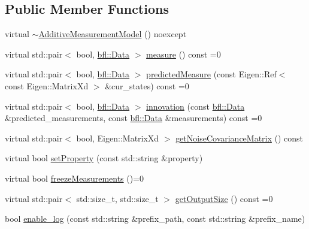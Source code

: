 \subsection*{Public Member Functions}
\begin{DoxyCompactItemize}
\item 
virtual \mbox{\hyperlink{classbfl_1_1AdditiveMeasurementModel_abe43cf581cf83131a74557cd265ea200}{$\sim$\+Additive\+Measurement\+Model}} () noexcept
\item 
virtual std\+::pair$<$ bool, \mbox{\hyperlink{namespacebfl_af6b103c6821db1b54452f776fdd9dd02}{bfl\+::\+Data}} $>$ \mbox{\hyperlink{classbfl_1_1MeasurementModel_ad372b720cef4e6bc0ac2489f4098bfc9}{measure}} () const =0
\item 
virtual std\+::pair$<$ bool, \mbox{\hyperlink{namespacebfl_af6b103c6821db1b54452f776fdd9dd02}{bfl\+::\+Data}} $>$ \mbox{\hyperlink{classbfl_1_1MeasurementModel_a8fc8798aa2db48f428d4ce59b33b5307}{predicted\+Measure}} (const Eigen\+::\+Ref$<$ const Eigen\+::\+Matrix\+Xd $>$ \&cur\+\_\+states) const =0
\item 
virtual std\+::pair$<$ bool, \mbox{\hyperlink{namespacebfl_af6b103c6821db1b54452f776fdd9dd02}{bfl\+::\+Data}} $>$ \mbox{\hyperlink{classbfl_1_1MeasurementModel_aa06e0643805551a981bcc013ad44c829}{innovation}} (const \mbox{\hyperlink{namespacebfl_af6b103c6821db1b54452f776fdd9dd02}{bfl\+::\+Data}} \&predicted\+\_\+measurements, const \mbox{\hyperlink{namespacebfl_af6b103c6821db1b54452f776fdd9dd02}{bfl\+::\+Data}} \&measurements) const =0
\item 
virtual std\+::pair$<$ bool, Eigen\+::\+Matrix\+Xd $>$ \mbox{\hyperlink{classbfl_1_1MeasurementModel_af25f42076b69e0c6cab47d36d796536f}{get\+Noise\+Covariance\+Matrix}} () const
\item 
virtual bool \mbox{\hyperlink{classbfl_1_1MeasurementModel_af97e18b52d1a3f365dd5982b8cc4aff7}{set\+Property}} (const std\+::string \&property)
\item 
virtual bool \mbox{\hyperlink{classbfl_1_1MeasurementModel_a67ef096c5b3682252582aec75498089d}{freeze\+Measurements}} ()=0
\item 
virtual std\+::pair$<$ std\+::size\+\_\+t, std\+::size\+\_\+t $>$ \mbox{\hyperlink{classbfl_1_1MeasurementModel_a6cca2022b576c9dbb61e73b83a10c6ee}{get\+Output\+Size}} () const =0
\item 
bool \mbox{\hyperlink{classbfl_1_1Logger_ae94b97b6e8d7902e8ce048384813122e}{enable\+\_\+log}} (const std\+::string \&prefix\+\_\+path, const std\+::string \&prefix\+\_\+name)
\item 

\end{DoxyCompactItemize}

